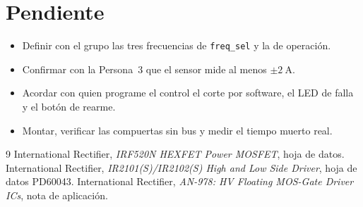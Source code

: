 \documentclass[10pt,twocolumn,letterpaper]{article}
\begin{document}
\section{Pendiente}
\begin{itemize}[leftmargin=*]
\item Definir con el grupo las tres frecuencias de \texttt{freq\_sel} y la de operación.
\item Confirmar con la Persona~3 que el sensor mide al menos $\pm\SI{2}{\ampere}$.
\item Acordar con quien programe el control el corte por software, el LED de falla y el botón de rearme.
\item Montar, verificar las compuertas sin bus y medir el tiempo muerto real.
\end{itemize}

\begin{thebibliography}{9}\footnotesize
{} International Rectifier, \emph{IRF520N HEXFET Power MOSFET}, hoja de datos.
 International Rectifier, \emph{IR2101(S)/IR2102(S) High and Low Side Driver}, hoja de datos PD60043.
 International Rectifier, \emph{AN-978: HV Floating MOS-Gate Driver ICs}, nota de aplicación.
\end{thebibliography}
\end{document}
